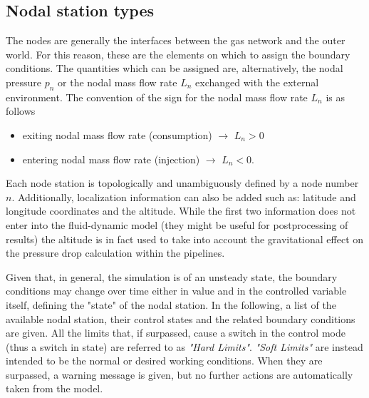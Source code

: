 \subsection{Nodal station types}
\label{sec:ModelDescr_NodeSt}
The nodes are generally the interfaces between the gas network and the outer world. For this reason, these are the elements on which to assign the boundary conditions. The quantities which can be assigned are, alternatively, the nodal pressure $p_n$ or the nodal mass flow rate $L_n$ exchanged with the external environment. The convention of the sign for the  nodal mass flow rate $L_n$ is as follows
\begin{itemize}
    \item exiting nodal mass flow rate (consumption) $\rightarrow$  $L_n > 0$
    \item entering nodal mass flow rate (injection) $\rightarrow$  $L_n < 0$.
\end{itemize}

Each node station is topologically and unambiguously defined by a node number $n$. Additionally, localization information can also be added such as: latitude and longitude coordinates and the altitude. While the first two information does not enter into the fluid-dynamic model (they might be useful for postprocessing of results) the altitude is in fact used to take into account the gravitational effect on the pressure drop calculation within the pipelines.

Given that, in general, the simulation is of an unsteady state, the boundary conditions may change over time either in value and in the controlled variable itself, defining the "state" of the nodal station. In the following, a list of the available nodal station, their control states and the related boundary conditions are given.
All the limits that, if surpassed, cause a switch in the control mode (thus a switch in state) are referred to as \textit{"Hard Limits"}.
\textit{"Soft Limits"} are instead intended to be the normal or desired working conditions. When they are surpassed, a warning message is given, but no further actions are automatically taken from the model.
